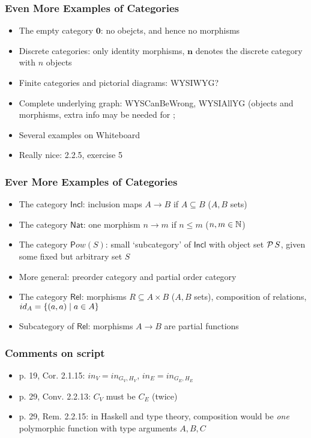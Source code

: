 \documentclass[handout]{beamer}
\newcommand{\Nat}{\mathsf{Nat}}
\newcommand{\Incl}{\mathsf{Incl}}
\newcommand{\Rel}{\mathsf{Rel}}
\begin{document}
\frame
  {   
    \frametitle{Even More Examples of Categories}\label{Ch2:evenMoreExaCat}

 \begin{itemize}[<+->]
\item The empty category $\mathbf{0}$: no obejcts, and hence no morphisms
\item Discrete categories: only identity morphisms, $\mathbf{n}$ denotes
the discrete category with $n$ objects
\item Finite categories and pictorial diagrams: WYSIWYG?
\item Complete underlying graph: WYSCanBeWrong, WYSIAllYG (objects and morphisms,
extra info may be needed for ;
\item Several examples on Whiteboard
\item Really nice: 2.2.5, exercise 5
 \end{itemize}

 }

\frame
  {   
    \frametitle{Ever More Examples of Categories}\label{Ch2:everMoreExaCat}
 \begin{itemize}[<+->]
\item The category $\Incl$: inclusion maps $A\to B$ if $A\subseteq B$ ($A,B$ sets)
\item The category $\Nat$: one morphism $n\to m$ if $n\leq m$  ($n,m\in\mathbb{N}$)
\item The category $\mathsf Pow(S)$: small `subcategory' of $\Incl$ with object
set $\operatorname{\mathcal{P}}{S}$, given some fixed but arbitrary set $S$
\item More general: preorder category and partial order category
\item The category $\Rel$: morphisms $R\subseteq A\times B$ ($A,B$ sets),
composition of relations, $id_A = \{(a,a)\mid a\in A\}$
\item Subcategory of $\Rel$: morphisms $A\to B$ are partial functions
 \end{itemize}

 }


\frame
  {   
    \frametitle{Comments on script}\label{Ch1:comments}

 \begin{itemize}[<+->]
\item p. 19, Cor. 2.1.15: $in_V = in_{G_V,H_V}$, $in_E = in_{G_E,H_E}$
\item p. 29, Conv. 2.2.13: $C_V$ must be $C_E$ (twice)
\item p. 29, Rem. 2.2.15: in Haskell and type theory, composition would be
\emph{one} polymorphic function with type arguments $A,B,C$
 \end{itemize}

 }
\end{document}
